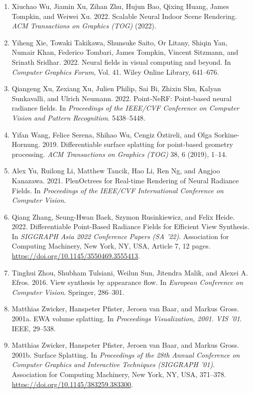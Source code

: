 \begin{enumerate}[leftmargin=2em, itemsep=0.3em, topsep=0.4em, parsep=0pt]
    \item Xiuchao Wu, Jiamin Xu, Zihan Zhu, Hujun Bao, Qixing Huang, James Tompkin, and Weiwei Xu. 2022. Scalable Neural Indoor Scene Rendering. \textit{ACM Transactions on Graphics (TOG)} (2022).

    \item Yiheng Xie, Towaki Takikawa, Shunsuke Saito, Or Litany, Shiqin Yan, Numair Khan, Federico Tombari, James Tompkin, Vincent Sitzmann, and Srinath Sridhar. 2022. Neural fields in visual computing and beyond. In \textit{Computer Graphics Forum}, Vol. 41. Wiley Online Library, 641--676.

    \item Qiangeng Xu, Zexiang Xu, Julien Philip, Sai Bi, Zhixin Shu, Kalyan Sunkavalli, and Ulrich Neumann. 2022. Point-NeRF: Point-based neural radiance fields. In \textit{Proceedings of the IEEE/CVF Conference on Computer Vision and Pattern Recognition}. 5438--5448.

    \item Yifan Wang, Felice Serena, Shihao Wu, Cengiz {\"O}ztireli, and Olga Sorkine-Hornung. 2019. Differentiable surface splatting for point-based geometry processing. \textit{ACM Transactions on Graphics (TOG)} 38, 6 (2019), 1--14.

    \item Alex Yu, Ruilong Li, Matthew Tancik, Hao Li, Ren Ng, and Angjoo Kanazawa. 2021. PlenOctrees for Real-time Rendering of Neural Radiance Fields. In \textit{Proceedings of the IEEE/CVF International Conference on Computer Vision}.

    \item Qiang Zhang, Seung-Hwan Baek, Szymon Rusinkiewicz, and Felix Heide. 2022. Differentiable Point-Based Radiance Fields for Efficient View Synthesis. In \textit{SIGGRAPH Asia 2022 Conference Papers (SA '22)}. Association for Computing Machinery, New York, NY, USA, Article 7, 12 pages. \url{https://doi.org/10.1145/3550469.3555413}.

    \item Tinghui Zhou, Shubham Tulsiani, Weilun Sun, Jitendra Malik, and Alexei A. Efros. 2016. View synthesis by appearance flow. In \textit{European Conference on Computer Vision}. Springer, 286--301.

    \item Matthias Zwicker, Hanspeter Pfister, Jeroen van Baar, and Markus Gross. 2001a. EWA volume splatting. In \textit{Proceedings Visualization, 2001. VIS '01}. IEEE, 29--538.

    \item Matthias Zwicker, Hanspeter Pfister, Jeroen van Baar, and Markus Gross. 2001b. Surface Splatting. In \textit{Proceedings of the 28th Annual Conference on Computer Graphics and Interactive Techniques (SIGGRAPH '01)}. Association for Computing Machinery, New York, NY, USA, 371--378. \url{https://doi.org/10.1145/383259.383300}.
\end{enumerate}
\endgroup
